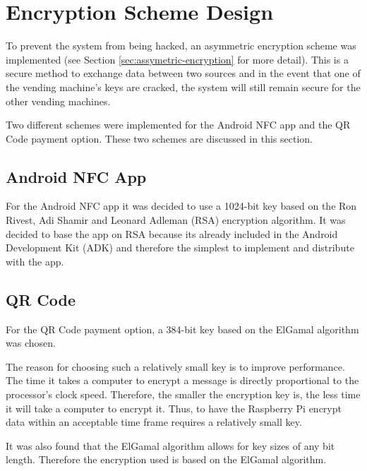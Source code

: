 \section{Encryption Scheme Design}

To prevent the system from being hacked, an asymmetric encryption scheme was
implemented (see Section \ref{sec:assymetric-encryption} for more detail). This
is a secure method to exchange data between two sources and in the event that
one of the vending machine's keys are cracked, the system will still remain
secure for the other vending machines.

Two different schemes were implemented for the Android NFC app and the QR Code
payment option. These two schemes are discussed in this section.

\subsection{Android NFC App}

For the Android NFC app it was decided to use a 1024-bit key based on the Ron
Rivest, Adi Shamir and Leonard Adleman (RSA) encryption algorithm. It was
decided to base the app on RSA because its already included in the Android
Development Kit (ADK) and therefore the simplest to implement and distribute
with the app. 

\subsection{QR Code}

For the QR Code payment option, a 384-bit key based on the ElGamal algorithm was
chosen. 

The reason for choosing such a relatively small key is to improve
performance. The time it takes a computer to encrypt a message is directly
proportional to the processor's clock speed. Therefore, the smaller the
encryption key is, the less time it will take a computer to encrypt it. Thus, to
have the Raspberry Pi encrypt data within an acceptable time frame requires a
relatively small key. 

It was also found that the ElGamal algorithm allows for key sizes of any bit
length. Therefore the encryption used is based on the ElGamal algorithm.
